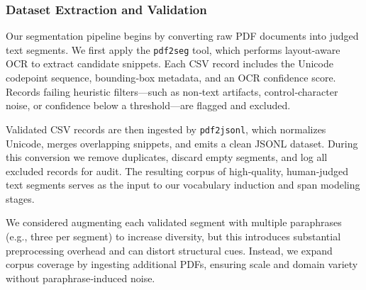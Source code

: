 \subsubsection{Dataset Extraction and Validation}
\label{sec:dataset-extraction}

Our segmentation pipeline begins by converting raw PDF documents into judged text segments.  We first apply the \texttt{pdf2seg} tool, which performs layout-aware OCR to extract candidate snippets.  Each CSV record includes the Unicode codepoint sequence, bounding‐box metadata, and an OCR confidence score.  Records failing heuristic filters—such as non‐text artifacts, control‐character noise, or confidence below a threshold—are flagged and excluded.

Validated CSV records are then ingested by \texttt{pdf2jsonl}, which normalizes Unicode, merges overlapping snippets, and emits a clean JSONL dataset.  During this conversion we remove duplicates, discard empty segments, and log all excluded records for audit.  The resulting corpus of high‐quality, human‐judged text segments serves as the input to our vocabulary induction and span modeling stages.

We considered augmenting each validated segment with multiple paraphrases (e.g., three per segment) to increase diversity, but this introduces substantial preprocessing overhead and can distort structural cues.  Instead, we expand corpus coverage by ingesting additional PDFs, ensuring scale and domain variety without paraphrase‐induced noise.